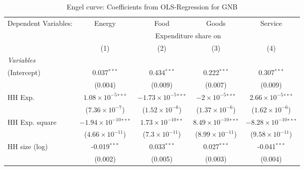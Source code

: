 
\begin{table}[htbp!]
   \centering
   \small
   \begin{adjustbox}{width = 1\textwidth, max height = 0.95\textheight, center}
      \begin{threeparttable}[b]
         \caption{\label{tab:Engel_parametric_GNB} Engel curve: Coefficients from OLS-Regression for GNB}
         \begin{tabular}{lcccc}
            \tabularnewline \midrule \midrule
            Dependent Variables: & Energy                          & Food                           & Goods                          & Service\\  
             & \multicolumn{4}{c}{Expenditure share on} \\ 
                                 & (1)                             & (2)                            & (3)                            & (4)\\  
            \midrule
            \emph{Variables}\\
            (Intercept)          & 0.037$^{***}$                   & 0.434$^{***}$                  & 0.222$^{***}$                  & 0.307$^{***}$\\   
                                 & (0.004)                         & (0.009)                        & (0.007)                        & (0.009)\\   
            HH Exp.              & $1.08\times 10^{-5}$$^{***}$    & $-1.73\times 10^{-5}$$^{***}$  & $-2\times 10^{-5}$$^{***}$     & $2.66\times 10^{-5}$$^{***}$\\    
                                 & ($7.36\times 10^{-7}$)          & ($1.52\times 10^{-6}$)         & ($1.37\times 10^{-6}$)         & ($1.62\times 10^{-6}$)\\    
            HH Exp. square       & $-1.94\times 10^{-10}$$^{***}$  & $1.73\times 10^{-10}$$^{**}$   & $8.49\times 10^{-10}$$^{***}$  & $-8.28\times 10^{-10}$$^{***}$\\    
                                 & ($4.66\times 10^{-11}$)         & ($7.3\times 10^{-11}$)         & ($8.99\times 10^{-11}$)        & ($9.58\times 10^{-11}$)\\    
            HH size (log)        & -0.019$^{***}$                  & 0.033$^{***}$                  & 0.027$^{***}$                  & -0.041$^{***}$\\   
                                 & (0.002)                         & (0.005)                        & (0.003)                        & (0.004)\\   

\end{tabular}
\end{threeparttable}
\end{adjustbox}
\end{table}

